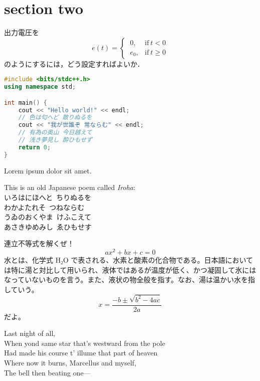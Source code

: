 \section{section two}

\begin{tcolorbox}[colback=myteal!5!white,colframe=myteal!75!black,title=\textsf{課題2}]
	出力電圧を
	\begin{equation*}
		e(t) =
		\begin{cases}
			\ 0,   & \text{if}\ t < 0   \\
			\ e_0, & \text{if}\ t \ge 0
		\end{cases}
	\end{equation*}
	のようにするには，どう設定すればよいか．
\end{tcolorbox}

\begin{lstlisting}[language=C++]
#include <bits/stdc++.h>
using namespace std;

int main() {
	cout << "Hello world!" << endl;
	// 色は匂へど 散りぬるを
	cout << "我が世誰ぞ 常ならむ" << endl;
	// 有為の奥山 今日越えて
	// 浅き夢見し 酔ひもせず
	return 0;
}
\end{lstlisting}

Lorem ipsum dolor sit amet.

This is an old Japanese poem called \emph{Iroha}: \\
いろはにほへと\ ちりぬるを \\
わかよたれそ\ つねならむ \\
うゐのおくやま\ けふこえて \\
あさきゆめみし\ ゑひもせす

連立不等式を解くぜ！
\begin{equation}
	ax^2 + bx + c = 0
\end{equation}
水とは、化学式 H₂O で表される、水素と酸素の化合物である。日本語においては特に湯と対比して用いられ、液体ではあるが温度が低く、かつ凝固して氷にはなっていないものを言う。また、液状の物全般を指す。なお、湯は温かい水を指していう。
\begin{equation}
	x = \frac{-b \pm \sqrt{b^2 - 4ac}}{2a}
\end{equation}
だよ。

Last night of all, \\
When yond same star that's westward from the pole \\
Had made his course t' illume that part of heaven \\
Where now it burns, Marcellus and myself, \\
The bell then beating one—
